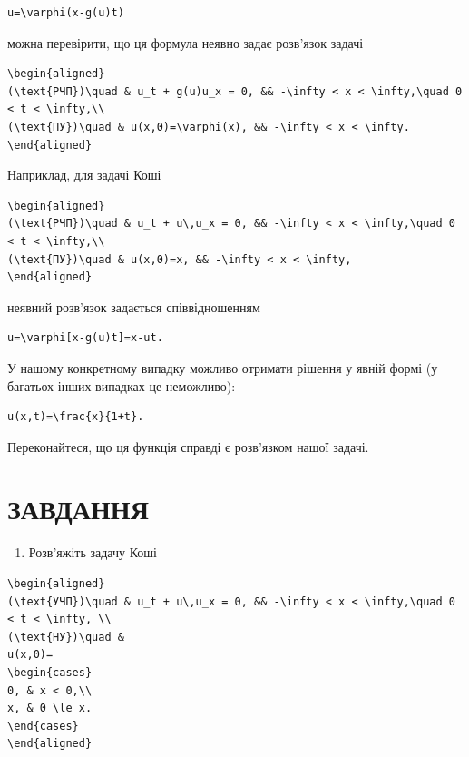 \documentclass[
  ukrainian,
]{article}
\providecommand{\tightlist}{%
  \setlength{\itemsep}{0pt}\setlength{\parskip}{0pt}}
\begin{document}
\begin{verbatim}
u=\varphi(x-g(u)t)
\end{verbatim}

можна перевірити, що ця формула неявно задає розв'язок задачі

\begin{verbatim}
\begin{aligned}
(\text{РЧП})\quad & u_t + g(u)u_x = 0, && -\infty < x < \infty,\quad 0 < t < \infty,\\
(\text{ПУ})\quad & u(x,0)=\varphi(x), && -\infty < x < \infty.
\end{aligned}
\end{verbatim}

Наприклад, для задачі Коші

\begin{verbatim}
\begin{aligned}
(\text{РЧП})\quad & u_t + u\,u_x = 0, && -\infty < x < \infty,\quad 0 < t < \infty,\\
(\text{ПУ})\quad & u(x,0)=x, && -\infty < x < \infty,
\end{aligned}
\end{verbatim}

неявний розв'язок задається співвідношенням

\begin{verbatim}
u=\varphi[x-g(u)t]=x-ut.
\end{verbatim}

У нашому конкретному випадку можливо отримати рішення у явній формі (у
багатьох інших випадках це неможливо):

\begin{verbatim}
u(x,t)=\frac{x}{1+t}.
\end{verbatim}

Переконайтеся, що ця функція справді є розв'язком нашої задачі.

\section{ЗАВДАННЯ}\label{ux437ux430ux432ux434ux430ux43dux43dux44f-6}

\begin{enumerate}
\def\labelenumi{\arabic{enumi}.}
\tightlist
\item
  Розв'яжіть задачу Коші
\end{enumerate}

\begin{verbatim}
\begin{aligned}
(\text{УЧП})\quad & u_t + u\,u_x = 0, && -\infty < x < \infty,\quad 0 < t < \infty, \\
(\text{НУ})\quad &
u(x,0)=
\begin{cases}
0, & x < 0,\\
x, & 0 \le x.
\end{cases}
\end{aligned}
\end{verbatim}
\end{document}
